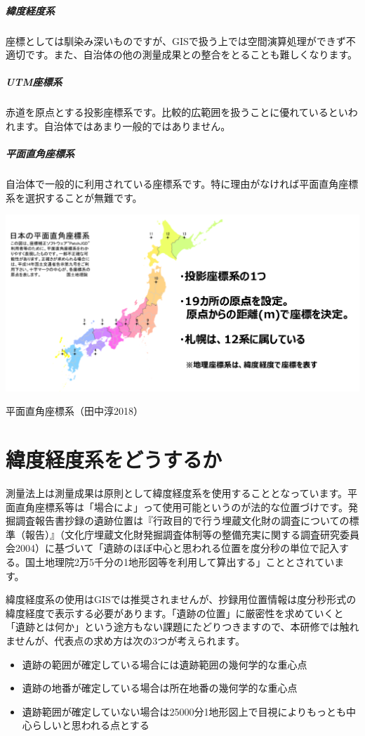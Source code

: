 \documentclass[14Q,twocolumn]{jsarticle}
\makeatletter
\newenvironment{figurehere}
  {\def\@captype{figure}}
  {}
\makeatother
\begin{document}
\subparagraph{緯度経度系}
座標としては馴染み深いものですが、GISで扱う上では空間演算処理ができず不適切です。また、自治体の他の測量成果との整合をとることも難しくなります。

\subparagraph{UTM座標系}
赤道を原点とする投影座標系です。比較的広範囲を扱うことに優れているといわれます。自治体ではあまり一般的ではありません。

\subparagraph{平面直角座標系}
自治体で一般的に利用されている座標系です。特に理由がなければ平面直角座標系を選択することが無難です。

\begin{figurehere}
\centering
\includegraphics[width=1\linewidth]{zahyou01.png}
\caption{平面直角座標系（田中淳2018）}
\end{figurehere}

\section{緯度経度系をどうするか}
測量法上は測量成果は原則として緯度経度系を使用することとなっています。平面直角座標系等は「場合によ」って使用可能というのが法的な位置づけです。発掘調査報告書抄録の遺跡位置は『行政目的で行う埋蔵文化財の調査についての標準（報告）』（文化庁埋蔵文化財発掘調査体制等の整備充実に関する調査研究委員会2004）に基づいて「遺跡のほぼ中心と思われる位置を度分秒の単位で記入する。国土地理院2万5千分の1地形図等を利用して算出する」こととされています。

緯度経度系の使用はGISでは推奨されませんが、抄録用位置情報は度分秒形式の緯度経度で表示する必要があります。「遺跡の位置」に厳密性を求めていくと「遺跡とは何か」という途方もない課題にたどりつきますので、本研修では触れませんが、代表点の求め方は次の3つが考えられます。

\begin{itemize}
\item 遺跡の範囲が確定している場合には遺跡範囲の幾何学的な重心点
\item 遺跡の地番が確定している場合は所在地番の幾何学的な重心点
\item 遺跡範囲が確定していない場合は25000分1地形図上で目視によりもっとも中心らしいと思われる点とする
\end{itemize}
\end{document}
